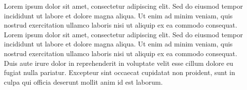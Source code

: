 


\begin{agradecimentos}

\lang
{
    Lorem ipsum dolor sit amet, consectetur adipiscing elit. Sed do eiusmod tempor incididunt ut labore et dolore magna aliqua. Ut enim ad minim veniam, quis nostrud exercitation ullamco laboris nisi ut aliquip ex ea commodo consequat.
}
{
    Lorem ipsum dolor sit amet, consectetur adipiscing elit. Sed do eiusmod tempor incididunt ut labore et dolore magna aliqua. Ut enim ad minim veniam, quis nostrud exercitation ullamco laboris nisi ut aliquip ex ea commodo consequat. Duis aute irure dolor in reprehenderit in voluptate velit esse cillum dolore eu fugiat nulla pariatur. Excepteur sint occaecat cupidatat non proident, sunt in culpa qui officia deserunt mollit anim id est laborum.
}

\end{agradecimentos}


%
%
%
